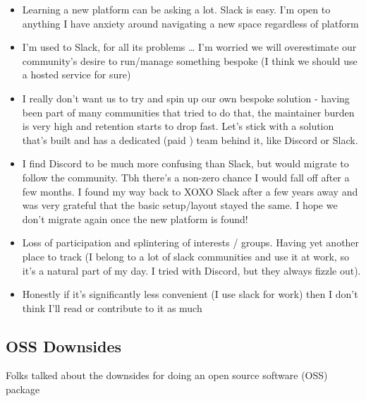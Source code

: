 \documentclass[
]{book}
\providecommand{\tightlist}{%
  \setlength{\itemsep}{0pt}\setlength{\parskip}{0pt}}
\begin{document}
\begin{itemize}
\tightlist
\item
  Learning a new platform can be asking a lot. Slack is easy. I'm open to anything I have anxiety around navigating a new space regardless of platform
\item
  I'm used to Slack, for all its problems \ldots{} I'm worried we will overestimate our community's desire to run/manage something bespoke (I think we should use a hosted service for sure)
\item
  I really don't want us to try and spin up our own bespoke solution - having been part of many communities that tried to do that, the maintainer burden is very high and retention starts to drop fast. Let's stick with a solution that's built and has a dedicated (paid ) team behind it, like Discord or Slack.
\item
  I find Discord to be much more confusing than Slack, but would migrate to follow the community. Tbh there's a non-zero chance I would fall off after a few months. I found my way back to XOXO Slack after a few years away and was very grateful that the basic setup/layout stayed the same. I hope we don't migrate again once the new platform is found!
\item
  Loss of participation and splintering of interests / groups. Having yet another place to track (I belong to a lot of slack communities and use it at work, so it's a natural part of my day. I tried with Discord, but they always fizzle out).
\item
  Honestly if it's significantly less convenient (I use slack for work) then I don't think I'll read or contribute to it as much
\end{itemize}

\subsection{OSS Downsides}\label{oss-downsides}

Folks talked about the downsides for doing an open source software (OSS) package
\end{document}
